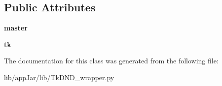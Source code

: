 \subsection*{Public Attributes}
\begin{DoxyCompactItemize}
\item 
\mbox{\label{classlib_1_1_tk_d_n_d__wrapper_1_1_tk_d_n_d_a767172e4b5b179f5d2002eb9a58af976}} 
{\bfseries master}
\item 
\mbox{\label{classlib_1_1_tk_d_n_d__wrapper_1_1_tk_d_n_d_a34aaff16f6b3a2b32f91f8ae8923c119}} 
{\bfseries tk}
\end{DoxyCompactItemize}


The documentation for this class was generated from the following file\+:\begin{DoxyCompactItemize}
\item 
lib/app\+Jar/lib/Tk\+D\+N\+D\+\_\+wrapper.\+py\end{DoxyCompactItemize}
